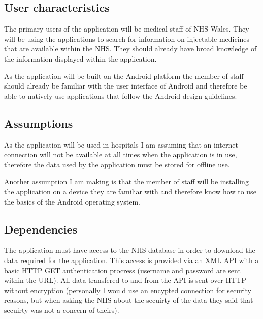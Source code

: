 \documentclass[11pt,fleqn,twoside]{article}
\begin{document}
\subsection{User characteristics}
The primary users of the application will be medical staff of NHS Wales. They will be using the applications to search for information on injectable medicines that are available within the NHS. They should already have broad knowledge of the information displayed within the application. 

As the application will be built on the Android platform the member of staff should already be familiar with the user interface of Android and therefore be able to natively use applications that follow the Android design guidelines.

\subsection{Assumptions}
As the application will be used in hospitals I am assuming that an internet connection will not be available at all times when the application is in use, therefore the data used by the application must be stored for offline use.

Another assumption I am making is that the member of staff will be installing the application on a device they are familiar with and therefore know how to use the basics of the Android operating system.

\subsection{Dependencies}
The application must have access to the NHS database in order to download the data required for the application. This access is provided via an XML API with a basic HTTP GET authentication procress (username and password are sent within the URL). All data transfered to and from the API is sent over HTTP without encryption (personally I would use an encypted connection for security reasons, but when asking the NHS about the secuirty of the data they said that secuirty was not a concern of theirs).
\end{document}
